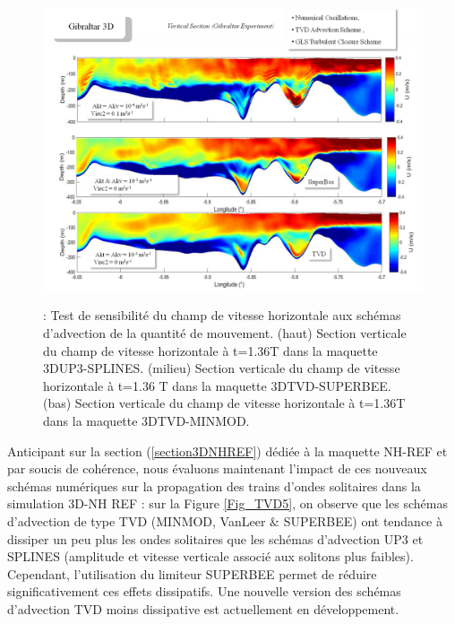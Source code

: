 \begin{figure}[!h]
	\begin{Center}
		\includegraphics[width=6.29in,height=3.55in]{./media/TVD4.png}
		\caption{ : Test de sensibilité du champ de vitesse horizontale aux schémas d’advection de la quantité de mouvement. (haut) Section verticale du champ de vitesse horizontale à t=1.36T dans la maquette 3DUP3-SPLINES. (milieu) Section verticale du champ de vitesse horizontale à t=1.36 T dans la maquette 3DTVD-SUPERBEE. (bas) Section verticale du champ de vitesse horizontale à t=1.36T dans la maquette 3DTVD-MINMOD.}
		\label{Fig_TVD4}
	\end{Center}
\end{figure}



\par

\par

\begin{justify}
Anticipant sur la section (\ref{section3DNHREF}) dédiée à la maquette NH-REF et par soucis de cohérence, nous évaluons maintenant l’impact de ces nouveaux schémas numériques sur la propagation des trains d’ondes solitaires dans la simulation 3D-NH REF : sur la Figure \ref{Fig_TVD5}, on observe que les schémas d’advection de type TVD (MINMOD, VanLeer $\&$  SUPERBEE) ont tendance à dissiper un peu plus les ondes solitaires que les schémas d’advection UP3 et SPLINES (amplitude et vitesse verticale associé aux solitons plus faibles). Cependant, l’utilisation du limiteur SUPERBEE permet de réduire significativement ces effets dissipatifs. Une nouvelle version des schémas d’advection TVD moins dissipative est actuellement en développement.
\end{justify}\par


